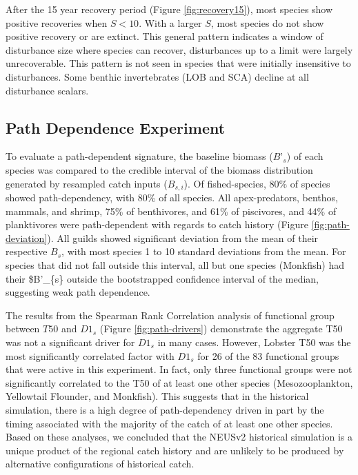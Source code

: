 \documentclass[
]{article}
\begin{document}
After the 15 year recovery period (Figure \ref{fig:recovery15}), most species show positive recoveries when \(S < 10\). With a larger \(S\), most species do not show positive recovery or are extinct. This general pattern indicates a window of disturbance size where species can recover, disturbances up to a limit were largely unrecoverable. This pattern is not seen in species that were initially insensitive to disturbances. Some benthic invertebrates (LOB and SCA) decline at all disturbance scalars.

\subsection{Path Dependence Experiment}\label{path-dependence-experiment-1}

To evaluate a path-dependent signature, the baseline biomass (\(B’_s\)) of each species was compared to the credible interval of the biomass distribution generated by resampled catch inputs (\(B_{s,i}\)). Of fished-species, 80\% of species showed path-dependency, with 80\% of all species. All apex-predators, benthos, mammals, and shrimp, 75\% of benthivores, and 61\% of piscivores, and 44\% of planktivores were path-dependent with regards to catch history (Figure \ref{fig:path-deviation}). All guilds showed significant deviation from the mean of their respective \(B_s\), with most species 1 to 10 standard deviations from the mean. For species that did not fall outside this interval, all but one species (Monkfish) had their \$B'\_\{s\} outside the bootstrapped confidence interval of the median, suggesting weak path dependence.

The results from the Spearman Rank Correlation analysis of functional group between \(T50\) and \(D1_s\) (Figure \ref{fig:path-drivers}) demonstrate the aggregate T50 was not a significant driver for \(D1_s\) in many cases. However, Lobster T50 was the most significantly correlated factor with \(D1_s\) for 26 of the 83 functional groups that were active in this experiment. In fact, only three functional groups were not significantly correlated to the T50 of at least one other species (Mesozooplankton, Yellowtail Flounder, and Monkfish). This suggests that in the historical simulation, there is a high degree of path-dependency driven in part by the timing associated with the majority of the catch of at least one other species. Based on these analyses, we concluded that the NEUSv2 historical simulation is a unique product of the regional catch history and are unlikely to be produced by alternative configurations of historical catch.
\end{document}
